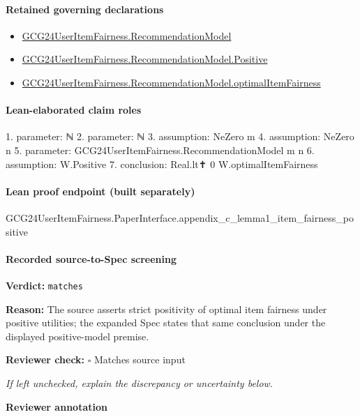 \documentclass[10pt]{article}
\newcommand{\reviewerbox}{%
  \par\noindent\fbox{\parbox{0.96\linewidth}{\rule{0pt}{0.38in}}}\par
}
\newcommand{\reviewmatch}[1]{%
  \par\noindent\textbf{Reviewer check:} $\square$\; #1\par
  \noindent\emph{If left unchecked, explain the discrepancy or uncertainty below.}\par
}
\begin{document}
\paragraph{Retained governing declarations}
\begin{itemize}\raggedright
\item \hyperlink{governing-declaration-4b845f20f80fb146}{GCG24\allowbreak{}User\allowbreak{}Item\allowbreak{}Fairness.\allowbreak{}Recommendation\allowbreak{}Model}
\item \hyperlink{governing-declaration-7ed309cdf4b5e0ea}{GCG24\allowbreak{}User\allowbreak{}Item\allowbreak{}Fairness.\allowbreak{}Recommendation\allowbreak{}Model.\allowbreak{}Positive}
\item \hyperlink{governing-declaration-3079e6c40671c151}{GCG24\allowbreak{}User\allowbreak{}Item\allowbreak{}Fairness.\allowbreak{}Recommendation\allowbreak{}Model.\allowbreak{}optimal\allowbreak{}Item\allowbreak{}Fairness}
\end{itemize}
\paragraph{Lean-elaborated claim roles}\begin{ReviewVerbatim}
1. parameter: ℕ
2. parameter: ℕ
3. assumption: NeZero m
4. assumption: NeZero n
5. parameter: GCG24UserItemFairness.RecommendationModel m n
6. assumption: W.Positive
7. conclusion: Real.lt✝ 0 W.optimalItemFairness
\end{ReviewVerbatim}

\paragraph{Lean proof endpoint (built separately)}\begin{ReviewVerbatim}
GCG24UserItemFairness.PaperInterface.appendix_c_lemma1_item_fairness_positive
\end{ReviewVerbatim}

\paragraph{Recorded source-to-Spec screening}
\textbf{Verdict:} \texttt{matches}
\\
{\raggedright
\textbf{Reason:} The source asserts strict positivity of optimal item fairness under positive utilities;\allowbreak{} the expanded Spec states that same conclusion under the displayed positive-\allowbreak{}model premise.\allowbreak{}
\par}
\reviewmatch{Matches source input}
\noindent\textbf{Reviewer annotation}\par
\reviewerbox
\clearpage
\hypertarget{source-claim-d461c27ad08b8393}{}
\end{document}
